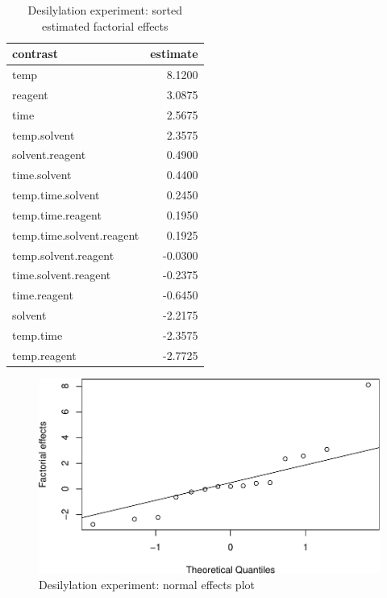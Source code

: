 \documentclass[
]{book}
\theoremstyle{definition}
\theoremstyle{definition}
\theoremstyle{definition}
\theoremstyle{definition}
\theoremstyle{remark}
\begin{document}
\begin{table}

\caption{\label{tab:desilylation-effects-plot1}Desilylation experiment: sorted estimated factorial effects}
\centering
\begin{tabular}[t]{l|r}
\hline
contrast & estimate\\
\hline
temp & 8.1200\\
\hline
reagent & 3.0875\\
\hline
time & 2.5675\\
\hline
temp.solvent & 2.3575\\
\hline
solvent.reagent & 0.4900\\
\hline
time.solvent & 0.4400\\
\hline
temp.time.solvent & 0.2450\\
\hline
temp.time.reagent & 0.1950\\
\hline
temp.time.solvent.reagent & 0.1925\\
\hline
temp.solvent.reagent & -0.0300\\
\hline
time.solvent.reagent & -0.2375\\
\hline
time.reagent & -0.6450\\
\hline
solvent & -2.2175\\
\hline
temp.time & -2.3575\\
\hline
temp.reagent & -2.7725\\
\hline
\end{tabular}
\end{table}

\begin{figure}

{\centering \includegraphics{bookdown_math3014-6027_files/figure-latex/desilylation-effects-plot1-1} 

}

\caption{Desilylation experiment: normal effects plot}\label{fig:desilylation-effects-plot1}
\end{figure}
\end{document}
